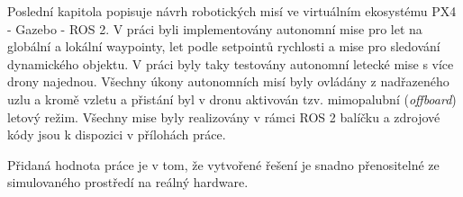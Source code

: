 Poslední kapitola popisuje návrh robotických misí ve virtuálním ekosystému PX4 - Gazebo - ROS 2. V práci byli implementovány autonomní mise pro let na globální a lokální waypointy, let podle setpointů rychlosti a mise pro sledování dynamického objektu. V práci byly taky testovány autonomní letecké mise s více drony najednou. Všechny úkony autonomních misí byly ovládány z nadřazeného uzlu a kromě vzletu a přistání byl v dronu aktivován tzv. mimopalubní (\textit{offboard}) letový režim. Všechny mise byly realizovány v rámci ROS 2 balíčku a zdrojové kódy jsou k dispozici v přílohách práce.

Přidaná hodnota práce je v tom, že vytvořené řešení je snadno přenositelné ze simulovaného prostředí na reálný hardware.
